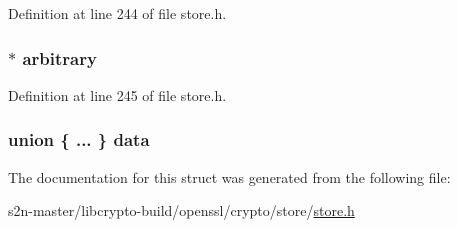 Definition at line 244 of file store.\+h.

\subsubsection[{\texorpdfstring{arbitrary}{arbitrary}}]{$\ast$ arbitrary}\hypertarget{struct_s_t_o_r_e___o_b_j_e_c_t__st_a4c1d5fbfbb1a626268c74e14826c4d2f}{}\label{struct_s_t_o_r_e___o_b_j_e_c_t__st_a4c1d5fbfbb1a626268c74e14826c4d2f}


Definition at line 245 of file store.\+h.

\subsubsection[{\texorpdfstring{data}{data}}]{\setlength{\rightskip}{0pt plus 5cm}union \{ ... \}   data}\hypertarget{struct_s_t_o_r_e___o_b_j_e_c_t__st_a967d5ce890e505b3f4bbe01efb2c6673}{}\label{struct_s_t_o_r_e___o_b_j_e_c_t__st_a967d5ce890e505b3f4bbe01efb2c6673}


The documentation for this struct was generated from the following file\+:\begin{DoxyCompactItemize}
\item 
s2n-\/master/libcrypto-\/build/openssl/crypto/store/\hyperlink{store_8h}{store.\+h}\end{DoxyCompactItemize}
